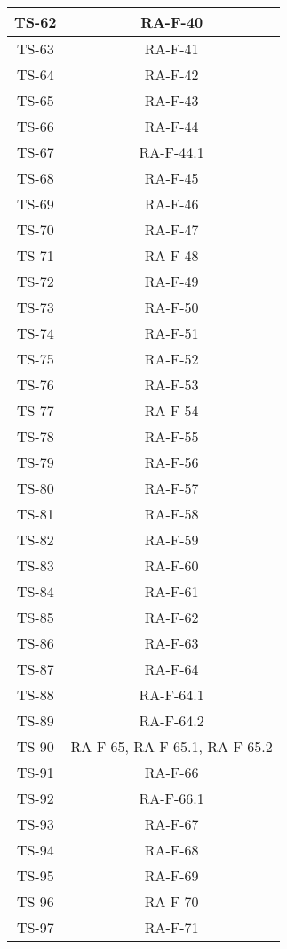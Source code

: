 \begin{center}
\begin{longtable}{|c|c|}
			\hline
			TS-62 & RA-F-40 \\
			\hline
			TS-63 & RA-F-41 \\
			\hline
			TS-64 & RA-F-42 \\
			\hline
			TS-65 & RA-F-43 \\
			\hline
			TS-66 & RA-F-44 \\
			\hline
			TS-67 & RA-F-44.1 \\
			\hline
			TS-68 & RA-F-45 \\
			\hline
			TS-69 & RA-F-46 \\
			\hline
			TS-70 & RA-F-47 \\
			\hline
			TS-71 & RA-F-48 \\
			\hline
			TS-72 & RA-F-49 \\
			\hline
			TS-73 & RA-F-50 \\
			\hline
			TS-74 & RA-F-51 \\
			\hline
			TS-75 & RA-F-52 \\
			\hline
			TS-76 & RA-F-53 \\
			\hline
			TS-77 & RA-F-54 \\
			\hline
			TS-78 & RA-F-55 \\
			\hline
			TS-79 & RA-F-56 \\
			\hline
			TS-80 & RA-F-57 \\
			\hline
			TS-81 & RA-F-58 \\
			\hline
			TS-82 & RA-F-59 \\
			\hline
			TS-83 & RA-F-60 \\
			\hline
			TS-84 & RA-F-61 \\
			\hline
			TS-85 & RA-F-62 \\
			\hline
			TS-86 & RA-F-63 \\
			\hline
			TS-87 & RA-F-64 \\
			\hline
			TS-88 & RA-F-64.1 \\
			\hline
			TS-89 & RA-F-64.2 \\
			\hline
			TS-90 & RA-F-65, RA-F-65.1, RA-F-65.2 \\
			\hline
			TS-91 & RA-F-66 \\
			\hline
			TS-92 & RA-F-66.1 \\
			\hline
			TS-93 & RA-F-67 \\
			\hline
			TS-94 & RA-F-68 \\
			\hline
			TS-95 & RA-F-69 \\
			\hline
			TS-96 & RA-F-70 \\
			\hline
			TS-97 & RA-F-71 \\

\end{longtable}
\end{center}
